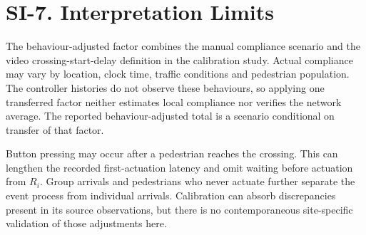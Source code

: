 \documentclass[11pt]{article}
\begin{document}


\section*{SI-7. Interpretation Limits}

The behaviour-adjusted factor combines the manual compliance scenario and the video crossing-start-delay definition in the calibration study. Actual compliance may vary by location, clock time, traffic conditions and pedestrian population. The controller histories do not observe these behaviours, so applying one transferred factor neither estimates local compliance nor verifies the network average. The reported behaviour-adjusted total is a scenario conditional on transfer of that factor.

Button pressing may occur after a pedestrian reaches the crossing. This can lengthen the recorded first-actuation latency and omit waiting before actuation from $R_i$. Group arrivals and pedestrians who never actuate further separate the event process from individual arrivals. Calibration can absorb discrepancies present in its source observations, but there is no contemporaneous site-specific validation of those adjustments here.
\end{document}

